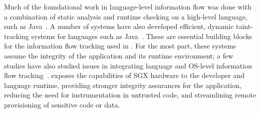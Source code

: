 Much of the foundational work in language-level information flow was done with a combination of static analysis
and runtime checking on a high-level language, such as Java~\citep{myers1999jflow, banerjee2002secure, hammer2006information, franz2008eliminating, chandra2007fine, smith2007improving, yip2009improving}.
A number of systems have also developed efficient, dynamic taint-tracking systems for languages such as Java~\citep{haldar2005dynamic, nair2008virtual}.
These are essential building blocks for the information flow tracking used in \sysname{}.
For the most part, these systems assume the integrity of the application and its runtime environment;
a few studies have also studied issues in integrating language and OS-level information flow tracking~\citep{roy2009laminar, sabelfeld2003language}.
\sysname{} exposes the capabilities of  SGX hardware to the developer and language runtime, providing
stronger integrity assurances for the application, reducing the need for instrumentation in untrusted code, and 
streamlining remote provisioning of sensitive code or data.

